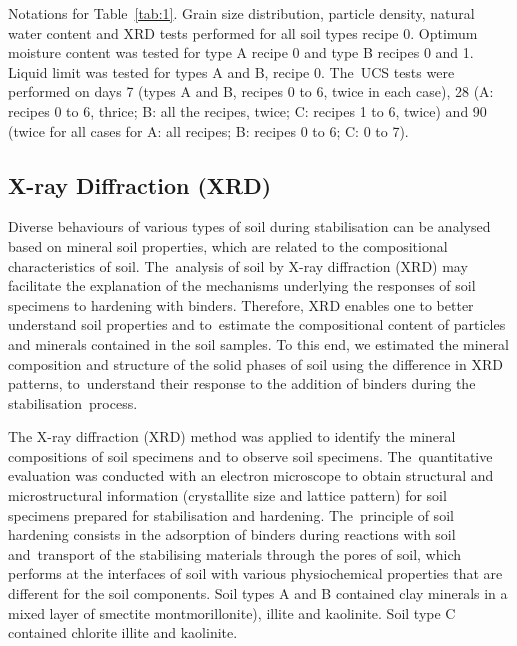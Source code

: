\documentclass[electronics,article,accept,pdftex,moreauthors]{Definitions/mdpi}
\begin{document}
\begin{table}[H]
    \footnotesize{Notations for Table~\ref{tab:1}. %
    Grain size distribution, particle density, natural water content and {XRD} tests{ }performed for all{ }soil types recipe 0. Optimum moisture content was tested for{ type} A recipe 0 and type B recipes 0 and 1. Liquid limit was tested for{ }types A and B, recipe 0. The~UCS tests were performed on days 7 ({types} A and B, recipes 0 to 6, twice in each case), 28 (A: recipes 0 to 6, thrice; B: all the recipes, twice; C: recipes 1 to 6, twice) and 90 (twice for all cases for A: all recipes; B: recipes 0 to 6; C: 0 to 7).}
\end{table}
\unskip

\subsection{X-ray Diffraction (XRD)}
{Diverse behaviours of various types of soil during stabilisation can be analysed based on mineral soil properties, which are related to the compositional characteristics of soil. The~analysis of soil by X-ray diffraction (XRD) may facilitate the explanation of the mechanisms underlying the responses of soil specimens to hardening with binders. Therefore, XRD enables one to better understand soil properties and to~estimate the compositional content of particles and minerals contained in the soil samples. }{To this end, we} estimated the mineral composition and structure of the solid phases of soil using the difference in {XRD} patterns, to~understand their response to the addition of binders during the stabilisation~process. 

{The X-ray diffraction (XRD) method was applied to identify the mineral compositions of soil specimens and to observe soil specimens. The~quantitative evaluation was conducted with an electron microscope to obtain structural and microstructural information (crystallite size and lattice pattern) for soil specimens prepared for stabilisation and hardening. The~principle of soil hardening} consists in the adsorption of binders during reactions with soil and~transport of the{ }stabilising {materials} through the pores of soil, which performs at {the} interfaces of soil with various {physiochemical} properties that are different for{ }the soil components. Soil types A and B contained clay minerals in a mixed layer of smectite{ }montmorillonite){, }illite{ and }kaolinite{. }Soil type C contained chlorite illite{ }and kaolinite{.} 
\end{document}
